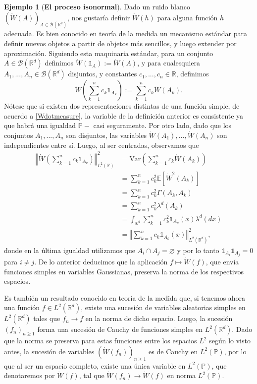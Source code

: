\documentclass[letterpaper,twoside,12pt]{book}
\newcommand{\R}{\mathbb{R}}
\newcommand{\B}{\mathcal{B}}
\newcommand{\E}{\mathbb{E}}
\renewcommand{\P}{\mathbb{P}}
\newcommand{\W}{\dot{W}}
\newcommand{\1}{\mathds{1}}
\renewcommand{\to}{\rightarrow}
\newcommand{\norm}[1]{\left\Vert #1 \right\Vert}
\theoremstyle{definition}
\theoremstyle{definition}
\theoremstyle{remark}
\theoremstyle{definition}
\theoremstyle{definition}
\theoremstyle{definition}
\theoremstyle{definition}
\newtheorem{ejem}{Ejemplo}
\theoremstyle{definition}
\begin{document}
\begin{ejem}[\textbf{El proceso isonormal}] 
Dado un ruido blanco $\left(\W(A)\right)_{A\in \B(\R^d)}$, nos gustaría definir $\W(h)$ para alguna función $h$ adecuada. Es bien conocido en teoría de la medida un mecanismo estándar para definir nuevos objetos a partir de objetos más sencillos, y luego extender por aproximación. Siguiendo esta maquinaria estándar, para un conjunto $A\in \B(\R^d)$ definimos $\W(\1_A):=\W(A)$, y para cualesquiera $A_1,...,A_n\in \B(\R^{d})$ disjuntos, y constantes $c_1,...,c_n\in \R$, definimos
\[
\W \left(\sum_{k=1}^{n}c_k\1_{A_k}\right):=\sum_{k=1}^{n}c_k\W(A_k).    
\]
Nótese que si existen dos representaciones distintas de una función simple, de acuerdo a \eqref{Wdotmeasure}, la variable de la definición anterior es consistente ya que habrá una igualdad $\P-$ casi seguramente. Por otro lado, dado que los conjuntos $A_1,...,A_n$ son disjuntos, las variables $\W(A_1),...,\W(A_n)$ son independientes entre sí. Luego, al ser centradas, observamos que
\begin{align*}
    \norm{\W \left(\sum_{k=1}^{n}c_k\1_{A_k}\right)}_{L^{2}(\P)}^2&=\text{Var}\left(\sum_{k=1}^{n}c_k\W(A_k)\right)\\
    &=\sum_{k=1}^{n}c_k^2 \E\left[\W^2(A_k)\right]\\
    &=\sum_{k=1}^{n}c_k^2 \Gamma(A_k,A_k)\\
    &=\sum_{k=1}^{n}c_k^2\lambda^{d}(A_k)\\
    &=\int_{\R^d}\sum_{k=1}^{n}c_k^2\1_{A_k}(x)\lambda^d(dx)\\
    &=\norm{\sum_{k=1}^{n}c_k\1_{A_k}(x)}^2_{L^{2}(\R^{d})},
\end{align*}
donde en la última igualdad utilizamos que $A_i\cap A_j=\varnothing$ y por lo tanto $\1_{A_i}\1_{A_j}=0$ para $i\neq j$. De lo anterior deducimos que la aplicación $f\longmapsto \W(f)$, que envía funciones simples en variables Gaussianas, preserva la norma de los respectivos espacios.

Es también un resultado conocido en teoría de la medida que, si tenemos ahora una función $f\in L^{2}(\R^{d})$, existe una sucesión de variables aleatorias simples en $L^{2}(\R^d)$ tales que $f_n\to f$ en la norma de dicho espacio. Luego, la sucesión $(f_n)_{n\ge 1}$ forma una sucesión de Cauchy de funciones simples en $L^2(\R^{d})$. Dado que la norma se preserva para estas funciones entre los espacios $L^2$ según lo visto antes, la sucesión de variables $(\W(f_n))_{n\ge 1}$ es de Cauchy en $L^{2}(\P)$, por lo que al ser un espacio completo, existe una única variable en $L^{2}(\P)$, que denotaremos por $\W(f)$, tal que $\W(f_n)\longrightarrow \W(f)$ en norma $L^{2}(\P)$.


\end{ejem}
\end{document}
